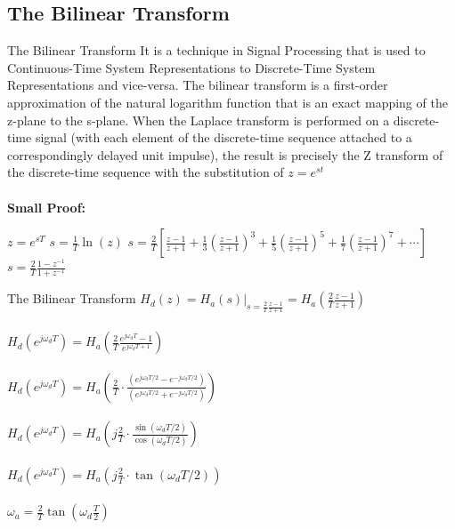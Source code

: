 \documentclass{beamer}
\begin{document}
\subsection{The Bilinear Transform}
\begin{frame}{The Bilinear Transform}
    \smallskip \hspace{2ex} It is a technique in Signal Processing that is used to Continuous-Time System
Representations to Discrete-Time System Representations and vice-versa. The bilinear transform is a first-order approximation of the natural logarithm function that is an exact mapping of the z-plane to the s-plane. When the Laplace transform is performed on a discrete-time signal (with each element of the discrete-time sequence attached to a correspondingly delayed unit impulse), the result is precisely the $\mathrm{Z}$ transform of the discrete-time sequence with the substitution of $z=e^{s t}$\\~\\
\textbf{Small Proof:}

$z=e^{s T}$
$s=\frac{1}{T} \ln (z)$
$s=\frac{2}{T}\left[\frac{z-1}{z+1}+\frac{1}{3}\left(\frac{z-1}{z+1}\right)^{3}+\frac{1}{5}\left(\frac{z-1}{z+1}\right)^{5}+\frac{1}{7}\left(\frac{z-1}{z+1}\right)^{7}+\cdots\right]$
$s=\frac{2}{T} \frac{1-z^{-1}}{1+z^{-1}}$
\end{frame}
\begin{frame}{The Bilinear Transform}
$H_{d}(z)=\left.H_{a}(s)\right|_{s=\frac{2}{T} \frac{z-1}{z+1}}=H_{a}\left(\frac{2}{T} \frac{z-1}{z+1}\right)$\\~\\

$H_{d}\left(e^{j \omega_{d} T}\right)=H_{a}\left(\frac{2}{T} \frac{e^{j \omega_{d} T}-1}{e^{j \omega_{d} T+1}}\right)$\\~\\

$H_{d}\left(e^{j \omega_{d} T}\right)=H_{a}\left(\frac{2}{T} \cdot \frac{\left(e^{j \omega_{d} T / 2}-e^{-j \omega_{d} T / 2}\right)}{\left(e^{j \omega_{d} T / 2}+e^{-j \omega_{d} T / 2}\right)}\right)$\\~\\

$H_{d}\left(e^{j \omega_{d} T}\right)=H_{a}\left(j \frac{2}{T} \cdot \frac{\sin \left(\omega_{d} T / 2\right)}{\cos \left(\omega_{d} T / 2\right)}\right)$\\~\\

$H_{d}\left(e^{j \omega_{d} T}\right)=H_{a}\left(j \frac{2}{T} \cdot \tan \left(\omega_{d} T / 2\right)\right)$\\~\\

$\omega_{a}=\frac{2}{T} \tan \left(\omega_{d} \frac{T}{2}\right)$
\end{frame}
\end{document}
